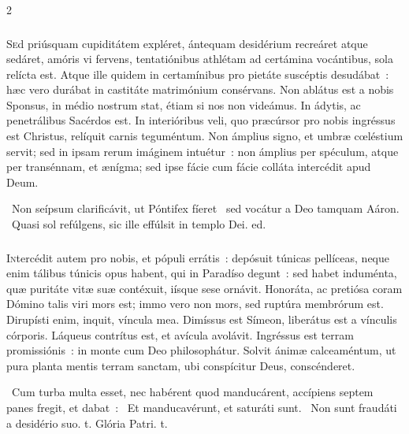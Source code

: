 \documentclass[9pt,twoside]{extarticle}
\begin{document}
\begin{multicols}{2}
{\subsubsection*{\center {}}
\lettrine{S}ed priúsquam cupiditátem expléret, ántequam desidérium recreáret atque sedáret, amóris vi fervens, tentatiónibus athlétam ad certámina vocántibus, sola relícta est. Atque ille quidem in certamínibus pro pietáte suscéptis desudábat~: hæc vero durábat in castitáte matrimónium consérvans. Non ablátus est a nobis Sponsus, in médio nostrum stat, étiam si nos non videámus. In ádytis, ac penetrálibus Sacérdos est. In interióribus veli, quo præcúrsor pro nobis ingréssus est Christus, relíquit carnis teguméntum. Non ámplius signo, et umbræ cœléstium servit; sed in ipsam rerum imáginem intuétur~: non ámplius per spéculum, atque per transénnam, et ænígma; sed ipse fácie cum fácie colláta intercédit apud Deum. 

\begin{tightlist}{}
\item {}~Non seípsum clarificávit, ut Póntifex fíeret \textred{*}~sed vocátur a Deo tamquam Aáron. ~Quasi sol refúlgens, sic ille effúlsit in templo Dei. ed.
\end{tightlist}

\subsubsection*{\center {}}
\lettrine{I}ntercédit autem pro nobis, et pópuli errátis~: depósuit túnicas pellíceas, neque enim tálibus túnicis opus habent, qui in Paradíso degunt~: sed habet induménta, quæ puritáte vitæ suæ contéxuit, iísque sese ornávit. Honoráta, ac pretiósa coram Dómino talis viri mors est; immo vero non mors, sed ruptúra membrórum est. Dirupísti enim, inquit, víncula mea. Dimíssus est Símeon, liberátus est a vínculis córporis. Láqueus contrítus est, et avícula avolávit. Ingréssus est terram promissiónis~: in monte cum Deo philosophátur. Solvit ánimæ calceaméntum, ut pura planta mentis terram sanctam, ubi conspícitur Deus, conscénderet.

\begin{tightlist}{}
\item {}~Cum turba multa esset, nec habérent quod manducárent, accípiens septem panes fregit, et dabat~: \textred{*}~Et manducavérunt, et saturáti sunt. ~Non sunt fraudáti a desidério suo. t. Glória Patri. t.
\end{tightlist}

}
\end{multicols}
\end{document}
